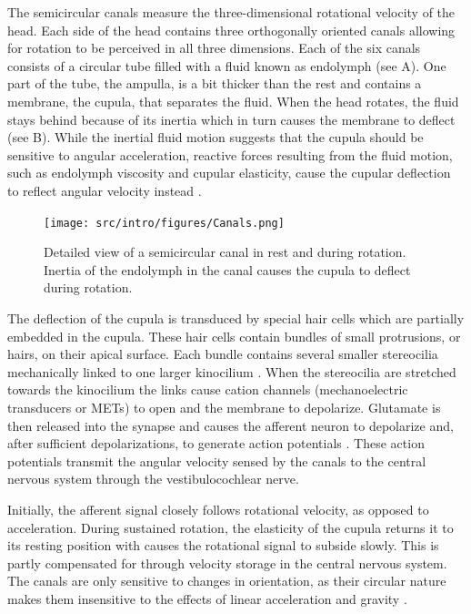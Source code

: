 The semicircular canals measure the three-dimensional rotational velocity of the head. Each side of the head contains three orthogonally oriented canals allowing for rotation to be perceived in all three dimensions. Each of the six canals consists of a circular tube filled with a fluid known as endolymph (see A). One part of the tube, the ampulla, is a bit thicker than the rest and contains a membrane, the cupula, that separates the fluid. When the head rotates, the fluid stays behind because of its inertia which in turn causes the membrane to deflect (see B). While the inertial fluid motion suggests that the cupula should be sensitive to angular acceleration, reactive forces resulting from the fluid motion, such as endolymph viscosity and cupular elasticity,  cause the cupular deflection to reflect angular velocity instead \cite{goldberg2012}.

\begin{figure}
    \texttt{[image: src/intro/figures/Canals.png]}
    \caption{Detailed view of a semicircular canal  in rest and  during rotation. Inertia of the endolymph in the canal causes the cupula to deflect during rotation.}
    \label{intro:fig3}
\end{figure}

The deflection of the cupula is transduced by special hair cells which are partially embedded in the cupula. These hair cells contain bundles of small protrusions, or hairs, on their apical surface. Each bundle contains several smaller stereocilia mechanically linked to one larger kinocilium \cite{pickles1984}. When the stereocilia are stretched towards the kinocilium the links cause cation channels (mechanoelectric transducers or METs) to open and the membrane to depolarize. Glutamate is then released into the synapse and causes the afferent neuron to depolarize and, after sufficient depolarizations, to generate action potentials \cite{purves2012}. These action potentials transmit the angular velocity sensed by the canals to the central nervous system through the  vestibulocochlear nerve.

Initially, the afferent signal closely follows rotational velocity, as opposed to acceleration. During sustained rotation, the elasticity of the cupula returns it to its resting position with causes the rotational signal to subside slowly. This is partly compensated for through velocity storage in the central nervous system. The canals are only sensitive to changes in orientation, as their circular nature makes them insensitive to the effects of linear acceleration and gravity \cite{goldberg2012}. 


